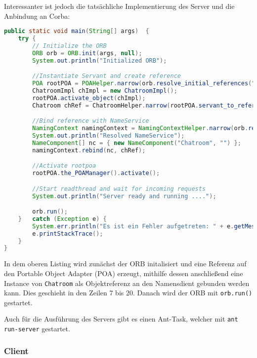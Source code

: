 Interessanter ist jedoch die tats\"achliche Implementierung des Server und die Anbindung an Corba:
\begin{lstlisting}[language=Java, caption=Server Main Methode]
public static void main(String[] args)  {
    try {
        // Initialize the ORB
        ORB orb = ORB.init(args, null);
        System.out.println("Initialized ORB");

        //Instantiate Servant and create reference
        POA rootPOA = POAHelper.narrow(orb.resolve_initial_references("RootPOA"));
        ChatroomImpl chImpl = new ChatroomImpl();
        rootPOA.activate_object(chImpl);
        Chatroom chRef = ChatroomHelper.narrow(rootPOA.servant_to_reference(chImpl));

        //Bind reference with NameService
        NamingContext namingContext = NamingContextHelper.narrow(orb.resolve_initial_references("NameService"));
        System.out.println("Resolved NameService");
        NameComponent[] nc = { new NameComponent("Chatroom", "") };
        namingContext.rebind(nc, chRef);

        //Activate rootpoa
        rootPOA.the_POAManager().activate();

        //Start readthread and wait for incoming requests
        System.out.println("Server ready and running ....");

        orb.run();
    }	catch (Exception e)	{
        System.err.println("Es ist ein Fehler aufgetreten: " + e.getMessage());
        e.printStackTrace();
    }
}
\end{lstlisting}

In dem oberen Listing wird zun\"achst der ORB initalisiert und eine Referenz auf den Portable Object Adapter (POA) erzeugt, mithilfe dessen anschlie\ss end eine Instance von \texttt{Chatroom} als Objektreferenz an den Namensdient gebunden werden kann.
Dies geschieht in den Zeilen 7 bis 20.
Danach wird der ORB mit \texttt{orb.run()} gestartet.

Auch f\"ur die Ausf\"uhrung des Servers gibt es einen Ant-Task, welcher mit \texttt{ant run-server} gestartet.

\subsubsection{Client}
